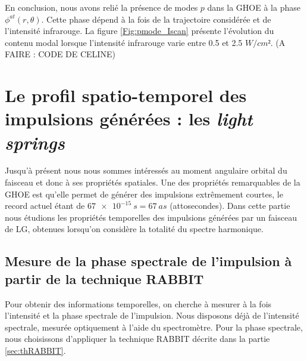 En conclusion, nous avons relié la présence de modes $p$ dans la GHOE à la phase $\phi^{at}(r,\theta)$. Cette phase dépend à la fois de la trajectoire considérée et de l'intensité infrarouge. La figure \ref{Fig:pmode_Iscan} présente l'évolution du contenu modal lorsque l'intensité infrarouge varie entre 0.5 et 2.5 $\si{W/cm²}$. (A FAIRE : CODE DE CELINE)

\chapter{Le profil spatio-temporel des impulsions générées : les \textit{light springs}}
Jusqu'à présent nous nous sommes intéressés au moment angulaire orbital du faisceau et donc à ses propriétés spatiales. Une des propriétés remarquables de la GHOE est qu'elle permet de générer des impulsions extrêmement courtes, le record actuel étant de $\SI{67e-15}{s}=\SI{67}{as}$ (attosecondes). Dans cette partie nous étudions les propriétés temporelles des impulsions générées par un faisceau de LG, obtenues lorsqu'on considère la totalité du spectre harmonique.

\section{Mesure de la phase spectrale de l'impulsion à partir de la technique RABBIT}
\label{sec:omabbit}
Pour obtenir des informations temporelles, on cherche à mesurer à la fois l'intensité et la phase spectrale de l'impulsion. Nous disposons déjà de l'intensité spectrale, mesurée optiquement à l'aide du spectromètre. Pour la phase spectrale, nous choisissons d'appliquer la technique RABBIT décrite dans la partie \ref{sec:thRABBIT}.

